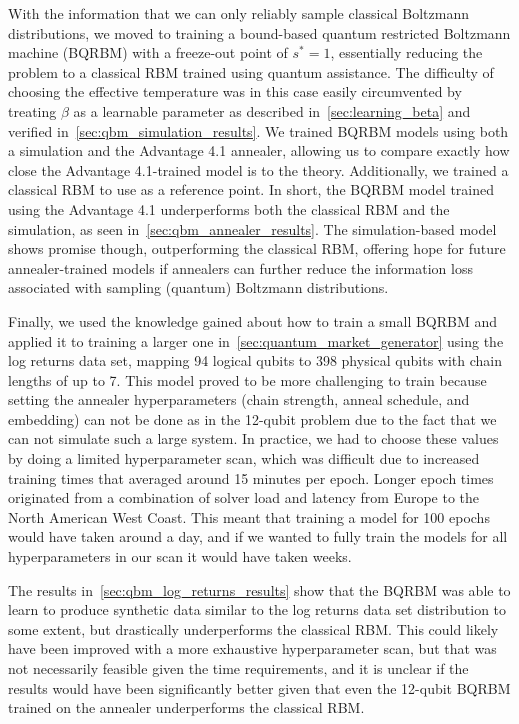 With the information that we can only reliably sample classical Boltzmann distributions, we moved to training a bound-based quantum restricted Boltzmann machine (BQRBM) with a freeze-out point of \( s^* = 1 \), essentially reducing the problem to a classical RBM trained using quantum assistance.
The difficulty of choosing the effective temperature was in this case easily circumvented by treating \( \beta \) as a learnable parameter as described in~\cref{sec:learning_beta} and verified in~\cref{sec:qbm_simulation_results}.
We trained BQRBM models using both a simulation and the Advantage 4.1 annealer, allowing us to compare exactly how close the Advantage 4.1-trained model is to the theory.
Additionally, we trained a classical RBM to use as a reference point.
In short, the BQRBM model trained using the Advantage 4.1 underperforms both the classical RBM and the simulation, as seen in~\cref{sec:qbm_annealer_results}.
The simulation-based model shows promise though, outperforming the classical RBM, offering hope for future annealer-trained models if annealers can further reduce the information loss associated with sampling (quantum) Boltzmann distributions.

Finally, we used the knowledge gained about how to train a small BQRBM and applied it to training a larger one in~\cref{sec:quantum_market_generator} using the log returns data set, mapping 94 logical qubits to 398 physical qubits with chain lengths of up to 7.
This model proved to be more challenging to train because setting the annealer hyperparameters (chain strength, anneal schedule, and embedding) can not be done as in the 12-qubit problem due to the fact that we can not simulate such a large system.
In practice, we had to choose these values by doing a limited hyperparameter scan, which was difficult due to increased training times that averaged around 15 minutes per epoch.
Longer epoch times originated from a combination of solver load and latency from Europe to the North American West Coast.
This meant that training a model for 100 epochs would have taken around a day, and if we wanted to fully train the models for all hyperparameters in our scan it would have taken weeks.

The results in~\cref{sec:qbm_log_returns_results} show that the BQRBM was able to learn to produce synthetic data similar to the log returns data set distribution to some extent, but drastically underperforms the classical RBM.
This could likely have been improved with a more exhaustive hyperparameter scan, but that was not necessarily feasible given the time requirements, and it is unclear if the results would have been significantly better given that even the 12-qubit BQRBM trained on the annealer underperforms the classical RBM.

